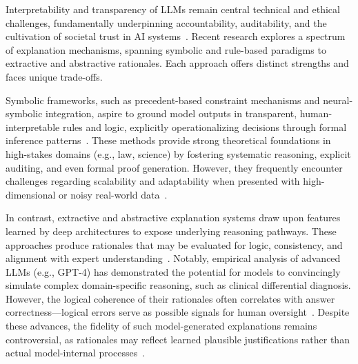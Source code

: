 \documentclass[sigconf]{acmart}
\begin{document}
Interpretability and transparency of LLMs remain central technical and ethical challenges, fundamentally underpinning accountability, auditability, and the cultivation of societal trust in AI systems~\cite{ref1, ref2, ref3, ref10, ref14, ref18, ref19, ref35, ref36, ref41, ref43, ref45, ref46, ref49, ref52, ref73, ref83, ref84, ref85}. Recent research explores a spectrum of explanation mechanisms, spanning symbolic and rule-based paradigms to extractive and abstractive rationales. Each approach offers distinct strengths and faces unique trade-offs.

Symbolic frameworks, such as precedent-based constraint mechanisms and neural-symbolic integration, aspire to ground model outputs in transparent, human-interpretable rules and logic, explicitly operationalizing decisions through formal inference patterns~\cite{ref14, ref18, ref19, ref45, ref73}. These methods provide strong theoretical foundations in high-stakes domains (e.g., law, science) by fostering systematic reasoning, explicit auditing, and even formal proof generation. However, they frequently encounter challenges regarding scalability and adaptability when presented with high-dimensional or noisy real-world data~\cite{ref14, ref18, ref41, ref46, ref83}.

In contrast, extractive and abstractive explanation systems draw upon features learned by deep architectures to expose underlying reasoning pathways. These approaches produce rationales that may be evaluated for logic, consistency, and alignment with expert understanding~\cite{ref1, ref3, ref10, ref35, ref41, ref45, ref49, ref85}. Notably, empirical analysis of advanced LLMs (e.g., GPT-4) has demonstrated the potential for models to convincingly simulate complex domain-specific reasoning, such as clinical differential diagnosis. However, the logical coherence of their rationales often correlates with answer correctness---logical errors serve as possible signals for human oversight~\cite{ref10, ref41}. Despite these advances, the fidelity of such model-generated explanations remains controversial, as rationales may reflect learned plausible justifications rather than actual model-internal processes~\cite{ref3, ref43, ref84}.
\end{document}

